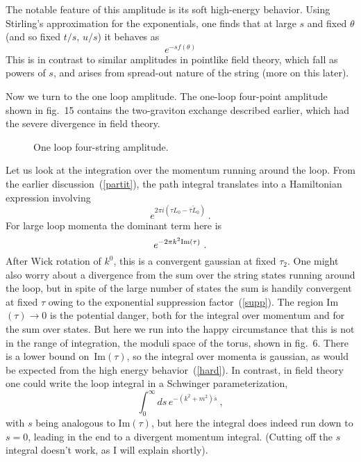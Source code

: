 The notable feature of this amplitude is its soft high-energy
behavior.  Using Stirling's approximation for the exponentials, one
finds that at large $s$ and fixed $\theta$ (and so fixed $t/s$,
$u/s$) it behaves as
\begin{equation}
e^{- s f(\theta)} \label{hard}
\end{equation}
This is in contrast to
similar amplitudes in pointlike field theory, which fall as powers
of $s$, and arises from spread-out nature of the string (more on
this later).

Now we turn to the one loop amplitude.  The one-loop four-point
amplitude shown in fig.~15 contains the two-graviton exchange
described earlier, which had the severe divergence in field theory.
\begin{figure}
\begin{center}
\leavevmode
{}
\end{center}
\caption[]{One loop four-string amplitude.}
\end{figure}
Let us look at the integration over the momentum running around
the loop.  From the earlier discussion~(\ref{partit}), the path
integral translates into a Hamiltonian expression
involving 
\begin{equation}
e^{2\pi i (\tau L_0 -\bar\tau \tilde L_0)}\ . \label{supp}
\end{equation}
For large loop momenta the dominant term here is
\begin{equation}
e^{-2\pi k^2 {\rm Im}(\tau)}\ .
\end{equation}
After Wick rotation of $k^0$, this is a convergent gaussian at
fixed $\tau_2$.  One might also worry about a divergence from the
sum over the string states running around the loop, but in spite
of the large number of states the sum is handily convergent
at fixed $\tau$ owing to the exponential suppression
factor~(\ref{supp}).  The region Im$(\tau) \to 0$ is the
potential danger, both for the integral over
momentum and for the sum over states.  But here we run into the
happy circumstance that this is not in the range of integration,
the moduli space of the torus, shown in fig.~6.  There is a
lower bound on~Im$(\tau)$, so the integral over momenta is
gaussian, as would be expected from the high energy
behavior~(\ref{hard}).  In contrast, in field theory one
could write the loop integral in a
Schwinger parameterization,
\begin{equation}
\int_0^\infty ds\, e^{-(k^2 + m^2)s}\ , \label{schwing}
\end{equation}
with $s$ being analogous to Im$(\tau)$, but here the integral
does indeed run down to $s=0$, leading in the end to a divergent
momentum integral.  (Cutting off the $s$ integral doesn't work,
as I will explain shortly).

